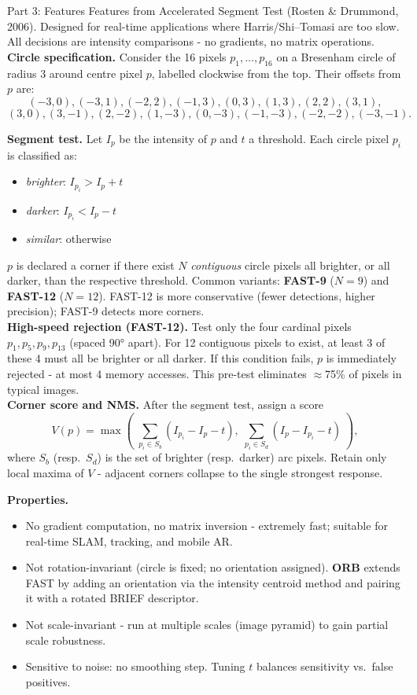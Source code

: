 \documentclass[letterpaper]{article}
\begin{document}
\begin{notes}{Part 3: Features}
Features from Accelerated Segment Test (Rosten \& Drummond, 2006). Designed for real-time applications where Harris/Shi--Tomasi are too slow. All decisions are intensity comparisons - no gradients, no matrix operations.\\

\textbf{Circle specification.} Consider the 16 pixels $p_1,\ldots,p_{16}$ on a Bresenham circle of radius 3 around centre pixel $p$, labelled clockwise from the top. Their offsets from $p$ are:
$$(-3,0),(-3,1),(-2,2),(-1,3),(0,3),(1,3),(2,2),(3,1),$$
$$(3,0),(3,-1),(2,-2),(1,-3),(0,-3),(-1,-3),(-2,-2),(-3,-1).$$

\textbf{Segment test.} Let $I_p$ be the intensity of $p$ and $t$ a threshold. Each circle pixel $p_i$ is classified as:
\begin{itemize}
    \item \emph{brighter}: $I_{p_i} > I_p + t$
    \item \emph{darker}: $I_{p_i} < I_p - t$
    \item \emph{similar}: otherwise
\end{itemize}
$p$ is declared a corner if there exist $N$ \emph{contiguous} circle pixels all brighter, or all darker, than the respective threshold. Common variants: \textbf{FAST-9} ($N=9$) and \textbf{FAST-12} ($N=12$). FAST-12 is more conservative (fewer detections, higher precision); FAST-9 detects more corners.\\

\textbf{High-speed rejection (FAST-12).} Test only the four cardinal pixels $p_1, p_5, p_9, p_{13}$ (spaced 90° apart). For 12 contiguous pixels to exist, at least 3 of these 4 must all be brighter or all darker. If this condition fails, $p$ is immediately rejected - at most 4 memory accesses. This pre-test eliminates $\approx$75\% of pixels in typical images.\\

\textbf{Corner score and NMS.} After the segment test, assign a score
$$V(p) = \max\!\left(\;\sum_{p_i \in S_b}(I_{p_i} - I_p - t),\;\sum_{p_i \in S_d}(I_p - I_{p_i} - t)\;\right),$$
where $S_b$ (resp.\ $S_d$) is the set of brighter (resp.\ darker) arc pixels. Retain only local maxima of $V$ - adjacent corners collapse to the single strongest response.

\textbf{Properties.}
\begin{itemize}
    \item No gradient computation, no matrix inversion - extremely fast; suitable for real-time SLAM, tracking, and mobile AR.
    \item Not rotation-invariant (circle is fixed; no orientation assigned). \textbf{ORB} extends FAST by adding an orientation via the intensity centroid method and pairing it with a rotated BRIEF descriptor.
    \item Not scale-invariant - run at multiple scales (image pyramid) to gain partial scale robustness.
    \item Sensitive to noise: no smoothing step. Tuning $t$ balances sensitivity vs.\ false positives.
\end{itemize}


\end{notes}
\end{document}
